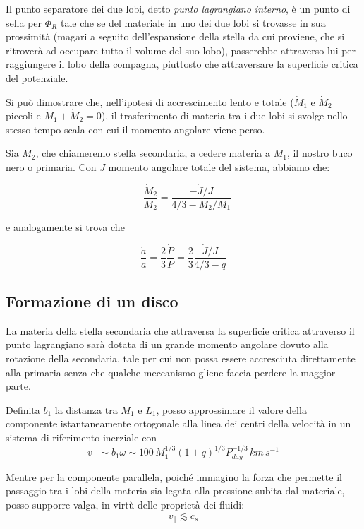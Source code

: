 \documentclass[a4paperbi]{article}
\begin{document}
	Il punto separatore dei due lobi, detto \textit{punto lagrangiano interno}, è un punto di sella per $\Phi_R$ tale che se del materiale in uno dei due lobi si trovasse in sua prossimità (magari a seguito dell'espansione della stella da cui proviene, che si ritroverà ad occupare tutto il volume del suo lobo), passerebbe attraverso lui per raggiungere il lobo della compagna, piuttosto che attraversare la superficie critica del potenziale.

	Si può dimostrare che, nell'ipotesi di accrescimento lento e totale ($\dot{M}_1$ e $\dot{M}_2$ piccoli e $\dot{M}_1+\dot{M}_2=0$), il trasferimento di materia tra i due lobi si svolge nello stesso tempo scala con cui il momento angolare viene perso.
	
	Sia $M_2$, che chiameremo stella secondaria, a cedere materia a $M_1$, il nostro buco nero o primaria. Con $J$ momento angolare totale del sistema, abbiamo che:
	
	\begin{equation}
		-\frac{\dot{M}_2}{M_2}=\frac{-\dot{J}/J}{4/3-M_2/M_1}
	\end{equation}
	
	e analogamente si trova che

	\begin{equation}
		\frac{\dot{a}}{a}=\frac{2}{3}\frac{\dot{P}}{P}=\frac{2}{3}\frac{\dot{J}/J}{4/3-q}
	\end{equation}
	
\subsection{Formazione di un disco}
	La materia della stella secondaria che attraversa la superficie critica attraverso il punto lagrangiano sarà dotata di un grande momento angolare dovuto alla rotazione della secondaria, tale per cui non possa essere accresciuta direttamente alla primaria senza che qualche meccanismo gliene faccia perdere la maggior parte.
	
	Definita $b_1$ la distanza tra $M_1$ e $L_1$, posso approssimare il valore della componente istantaneamente ortogonale alla linea dei centri della velocità in un sistema di riferimento inerziale con
	\begin{equation}
		v_\perp\sim b_1\omega\sim 100\,M_1^{1/3}(1+q)^{1/3}P^{-1/3}_{day}\,km\,s^{-1}
	\end{equation}  
	
	Mentre per la componente parallela, poiché immagino la forza che permette il passaggio tra i lobi della materia sia legata alla pressione subita dal materiale, posso supporre valga, in virtù delle proprietà dei fluidi:
	\begin{equation}
		v_\parallel \lesssim c_{s}
	\end{equation}
	
\end{document}
